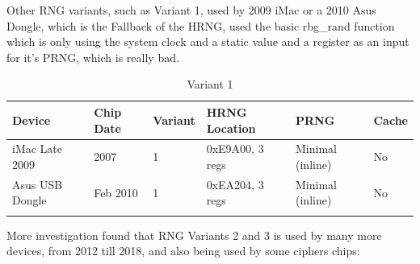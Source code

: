     Other RNG variants, such as Variant 1, used by 2009 iMac or a 2010 Asus Dongle, which is the Fallback of the HRNG, used the basic rbg\_rand function which is only using the system clock and a static value and a register as an input for it’s PRNG, which is really bad.
    
    \begin{table}[htb]
                \caption{Variant 1}	
                \begin{adjustbox}{width=\textwidth}

        \begin{tabular}{llllll}
            \hline
            \multicolumn{1}{|l|}{\textbf{Device}}   & \multicolumn{1}{l|}{\textbf{Chip Date}} & \multicolumn{1}{l|}{\textbf{Variant}} & \multicolumn{1}{l|}{\textbf{HRNG Location}} & \multicolumn{1}{l|}{\textbf{PRNG}}      & \multicolumn{1}{l|}{\textbf{Cache}} \\ \hline
            \multicolumn{1}{|l|}{iMac Late   2009}  & \multicolumn{1}{l|}{2007}               & \multicolumn{1}{l|}{1}                & \multicolumn{1}{l|}{0xE9A00, 3   regs}      & \multicolumn{1}{l|}{Minimal   (inline)} & \multicolumn{1}{l|}{No}             \\ \hline
            \multicolumn{1}{|l|}{Asus USB   Dongle} & \multicolumn{1}{l|}{Feb 2010}           & \multicolumn{1}{l|}{1}                & \multicolumn{1}{l|}{0xEA204, 3   regs}      & \multicolumn{1}{l|}{Minimal   (inline)} & \multicolumn{1}{l|}{No}             \\ \hline
            &                                         &                                       &                                             &                                         &                                    
        \end{tabular}
    \end{adjustbox}

    \end{table}
    
    More investigation found that RNG Variants 2 and 3 is used by many more devices, from 2012 till 2018, and also being used by some ciphers chips:
    
